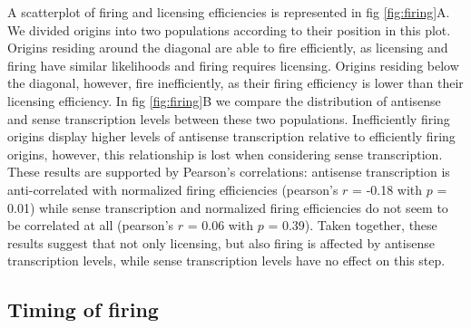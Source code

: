 A scatterplot of firing and licensing efficiencies is represented in fig \ref{fig:firing}A.
We divided origins into two populations according to their position in this plot.
Origins residing around the diagonal are able to fire efficiently, as licensing and firing have similar likelihoods and firing requires licensing. Origins residing below the diagonal, however, fire inefficiently, as their firing efficiency is lower than their licensing efficiency. 
In fig \ref{fig:firing}B we compare the distribution of antisense and sense transcription levels between these two populations. Inefficiently firing origins display higher levels of antisense transcription relative to efficiently firing origins, however, this relationship is lost when considering sense transcription. 
These results are supported by Pearson’s correlations: antisense transcription is anti-correlated with normalized firing efficiencies (pearson’s $r$ = -0.18 with $p$ = 0.01) while sense transcription and normalized firing efficiencies do not seem to be correlated at all (pearson’s $r$ = 0.06 with $p$ = 0.39). 
Taken together, these results suggest that not only licensing, but also firing is affected by antisense transcription levels, while sense transcription levels have no effect on this step.


\subsection{Timing of firing}

